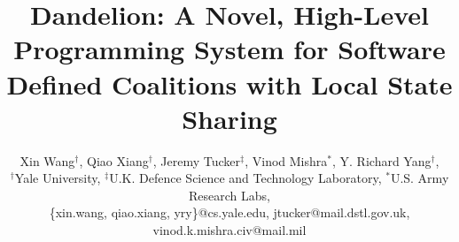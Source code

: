 \documentclass[UTF8]{ctexart}
\newcommand{\concept}{{Dandelion}}
\begin{document}
\title{\huge \concept{}: A Novel, High-Level Programming System for Software
Defined Coalitions with Local State Sharing}

\author{ 
	Xin Wang$^{\dagger}$,
	Qiao Xiang$^{\dagger}$,
	Jeremy Tucker$^{\ddagger}$,
	Vinod Mishra$^{*}$,
	Y. Richard Yang$^{\dagger}$,\\ 
	$^{\dagger}$Yale University,
	$^{\ddagger}$U.K. Defence Science and Technology Laboratory, 
	$^{*}$U.S. Army Research Labs,\\
	\{xin.wang, qiao.xiang, yry\}@cs.yale.edu,
	jtucker@mail.dstl.gov.uk, 
	vinod.k.mishra.civ@mail.mil 
}

\maketitle







%




\end{document}
